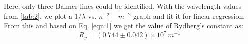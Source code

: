 	Here, only three Balmer lines could be identified. With the wavelength values from \ref{tab:2}, we plot a $1/\lambda$ vs. $n^{-2}-m^{-2}$ graph and fit it for linear regression. From this and based on Eq. \ref{eqn:1} we get the value of Rydberg's constant as:
	$$R_y = (0.744 \pm 0.042) \times 10^{7}\,m^{-1}$$

